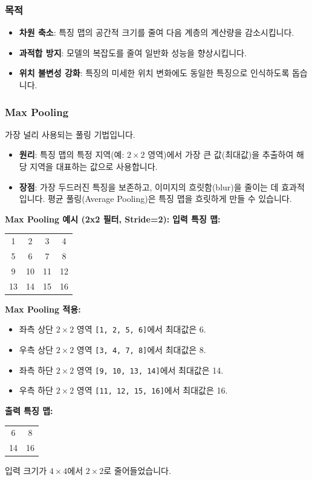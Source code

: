 \documentclass[11pt,a4paper]{article}
\theoremstyle{definition}
\begin{document}
\subsubsection{목적}
\begin{itemize}
    \item \textbf{차원 축소}: 특징 맵의 공간적 크기를 줄여 다음 계층의 계산량을 감소시킵니다.
    \item \textbf{과적합 방지}: 모델의 복잡도를 줄여 일반화 성능을 향상시킵니다.
    \item \textbf{위치 불변성 강화}: 특징의 미세한 위치 변화에도 동일한 특징으로 인식하도록 돕습니다.
\end{itemize}

\subsubsection{Max Pooling}
가장 널리 사용되는 풀링 기법입니다.
\begin{itemize}
    \item \textbf{원리}: 특징 맵의 특정 지역(예: $2 \times 2$ 영역)에서 가장 큰 값(최대값)을 추출하여 해당 지역을 대표하는 값으로 사용합니다.
    \item \textbf{장점}: 가장 두드러진 특징을 보존하고, 이미지의 흐릿함(blur)을 줄이는 데 효과적입니다. 평균 풀링(Average Pooling)은 특징 맵을 흐릿하게 만들 수 있습니다.
\end{itemize}

\begin{tcolorbox}[examplebox, title=\textbf{예시}]
\textbf{Max Pooling 예시 (2x2 필터, Stride=2):}
\textbf{입력 특징 맵:}
\begin{tabular}{cccc}
\toprule
1 & 2 & 3 & 4 \\
5 & 6 & 7 & 8 \\
9 & 10 & 11 & 12 \\
13 & 14 & 15 & 16 \\
\bottomrule
\end{tabular}

\textbf{Max Pooling 적용:}
\begin{itemize}
    \item 좌측 상단 $2 \times 2$ 영역 \texttt{[1, 2, 5, 6]}에서 최대값은 6.
    \item 우측 상단 $2 \times 2$ 영역 \texttt{[3, 4, 7, 8]}에서 최대값은 8.
    \item 좌측 하단 $2 \times 2$ 영역 \texttt{[9, 10, 13, 14]}에서 최대값은 14.
    \item 우측 하단 $2 \times 2$ 영역 \texttt{[11, 12, 15, 16]}에서 최대값은 16.
\end{itemize}
\textbf{출력 특징 맵:}
\begin{tabular}{cc}
\toprule
6 & 8 \\
14 & 16 \\
\bottomrule
\end{tabular}
입력 크기가 $4 \times 4$에서 $2 \times 2$로 줄어들었습니다.
\end{tcolorbox}
\end{document}
